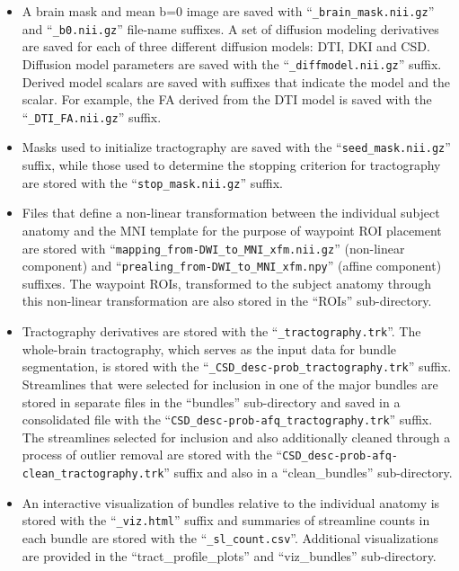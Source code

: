 \documentclass[fleqn,10pt,inline]{wlscirep}
\begin{document}
\begin{itemize}

\item A brain mask and mean b=0 image are saved with ``\texttt{\_brain\_mask.nii.gz}'' and ``\texttt{\_b0.nii.gz}'' file-name suffixes. A set of diffusion modeling derivatives are saved for each of  three different diffusion models: DTI, DKI and CSD. Diffusion model parameters are saved with the ``\texttt{\_diffmodel.nii.gz}'' suffix. Derived model scalars are saved with suffixes that indicate the model and the scalar. For example, the FA derived from the DTI model is saved with the ``\texttt{\_DTI\_FA.nii.gz}'' suffix. 

\item Masks used to initialize tractography are saved with the ``\texttt{seed\_mask.nii.gz}'' suffix, while those used to determine the stopping criterion for tractography are stored with  the ``\texttt{stop\_mask.nii.gz}'' suffix. 

\item Files that define a non-linear transformation between the individual subject anatomy and the MNI template for the purpose of waypoint ROI placement are stored with ``\texttt{mapping\_from-DWI\_to\_MNI\_xfm.nii.gz}'' (non-linear component) and ``\texttt{prealing\_from-DWI\_to\_MNI\_xfm.npy}'' (affine component) suffixes. The waypoint ROIs, transformed to the subject anatomy through this non-linear transformation are also stored in the ``ROIs'' sub-directory.

\item Tractography derivatives are stored with the ``\texttt{\_tractography.trk}''. The whole-brain tractography, which serves as the input data for bundle segmentation, is stored with the ``\texttt{\_CSD\_desc-prob\_tractography.trk}'' suffix. Streamlines that were selected for inclusion in one of the major bundles are stored in separate files in the ``bundles'' sub-directory and saved in a consolidated file with the ``\texttt{CSD\_desc-prob-afq\_tractography.trk}'' suffix. The streamlines selected for inclusion and also additionally cleaned through a process of outlier removal are stored with the ``\texttt{CSD\_desc-prob-afq-clean\_tractography.trk}'' suffix and also in a ``clean\_bundles'' sub-directory. 

\item An interactive visualization of bundles relative to the individual anatomy is stored with the ``\texttt{\_viz.html}'' suffix and summaries of streamline counts in each bundle are stored with the ``\texttt{\_sl\_count.csv}''. Additional visualizations are provided in the ``tract\_profile\_plots'' and ``viz\_bundles'' sub-directory.


\end{itemize}
\end{document}
